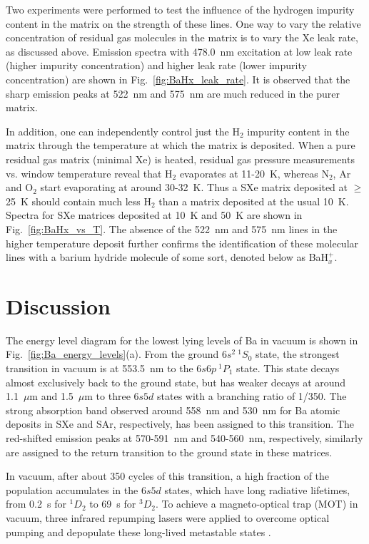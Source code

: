 \documentclass[aps,pra,reprint,superscriptaddress]{revtex4-1}
\begin{document}
Two experiments were performed to test the influence of the hydrogen impurity content in the matrix on the strength of these lines.
One way to vary the relative concentration of residual gas molecules in the matrix is to vary the Xe leak rate, as discussed above.
Emission spectra with 478.0~nm excitation at low leak rate (higher impurity concentration) and higher leak rate (lower impurity concentration) are shown in Fig.~\ref{fig:BaHx_leak_rate}.  
It is observed that the sharp emission peaks at 522~nm and 575~nm are much reduced in the purer matrix.  


In addition, one can independently control just the H$_2$ impurity content in the matrix through the temperature at which the matrix is deposited.  
When a pure residual gas matrix (minimal Xe) is heated, residual gas pressure measurements vs. window temperature reveal that H$_2$ evaporates at 11-20~K, whereas N$_2$, Ar and O$_2$ start evaporating at around 30-32~K. 
Thus a SXe matrix deposited at $\ge$ 25~K should contain much less H$_2$ than a matrix deposited at the usual 10~K.  
Spectra for SXe matrices deposited at 10~K and 50~K are shown in Fig.~\ref{fig:BaHx_vs_T}.  
The absence of the 522~nm and 575~nm lines in the higher temperature deposit further confirms the identification of these molecular lines with a barium hydride molecule of some sort, denoted below as BaH$_x^+$.



\section{Discussion}

The energy level diagram for the lowest lying levels of Ba in vacuum is shown in Fig.~\ref{fig:Ba_energy_levels}(a).  
From the ground $6s^2 ~^1S_0$ state, the strongest transition in vacuum is at 553.5~nm to the $6s6p ~^1P_1$ state.  
This state decays almost exclusively back to the ground state, but has weaker decays at around 1.1~$\mu$m and 1.5~$\mu$m to three $6s5d$ states with a branching ratio of 1/350.  
The strong absorption band observed around 558~nm and 530~nm for Ba atomic deposits in SXe and SAr, respectively, has been assigned to this transition.  
The red-shifted emission peaks at 570-591~nm and 540-560~nm, respectively, similarly are assigned to the return transition to the ground state in these matrices.


In vacuum, after about 350 cycles of this transition, a high fraction of the population accumulates in the $6s5d$ states, which have long radiative lifetimes, from 0.2~s for $^1D_2$ to 69~s for $^3D_2$.
To achieve a magneto-optical trap (MOT) in vacuum, three infrared repumping lasers were applied to overcome optical pumping and depopulate these long-lived metastable states \cite{De2009}.
\end{document}
